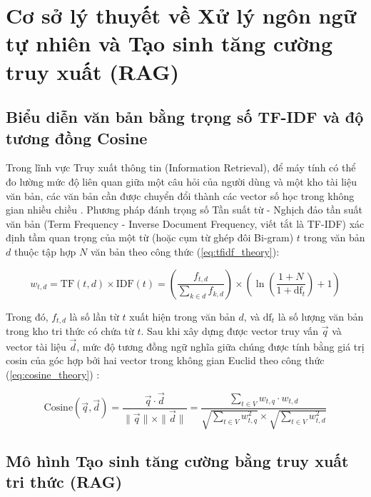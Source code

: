 \section{Cơ sở lý thuyết về Xử lý ngôn ngữ tự nhiên và Tạo sinh tăng cường truy xuất (RAG)}

\subsection{Biểu diễn văn bản bằng trọng số TF-IDF và độ tương đồng Cosine}

Trong lĩnh vực Truy xuất thông tin (Information Retrieval), để máy tính có thể đo lường mức độ liên quan giữa một câu hỏi của người dùng và một kho tài liệu văn bản, các văn bản cần được chuyển đổi thành các vector số học trong không gian nhiều chiều \cite{manning2008ir}. Phương pháp đánh trọng số Tần suất từ - Nghịch đảo tần suất văn bản (Term Frequency - Inverse Document Frequency, viết tắt là TF-IDF) xác định tầm quan trọng của một từ (hoặc cụm từ ghép đôi Bi-gram) $t$ trong văn bản $d$ thuộc tập hợp $N$ văn bản theo công thức (\ref{eq:tfidf_theory}):

\begin{equation}
\label{eq:tfidf_theory}
w_{t,d} = \text{TF}(t, d) \times \text{IDF}(t) = \left( \frac{f_{t,d}}{\sum_{k \in d} f_{k,d}} \right) \times \left( \ln \left( \frac{1 + N}{1 + \text{df}_t} \right) + 1 \right)
\end{equation}

Trong đó, $f_{t,d}$ là số lần từ $t$ xuất hiện trong văn bản $d$, và $\text{df}_t$ là số lượng văn bản trong kho tri thức có chứa từ $t$. Sau khi xây dựng được vector truy vấn $\vec{q}$ và vector tài liệu $\vec{d}$, mức độ tương đồng ngữ nghĩa giữa chúng được tính bằng giá trị cosin của góc hợp bởi hai vector trong không gian Euclid theo công thức (\ref{eq:cosine_theory}) \cite{manning2008ir}:

\begin{equation}
\label{eq:cosine_theory}
\text{Cosine}(\vec{q}, \vec{d}) = \frac{\vec{q} \cdot \vec{d}}{\|\vec{q}\| \times \|\vec{d}\|} = \frac{\sum_{t \in V} w_{t,q} \cdot w_{t,d}}{\sqrt{\sum_{t \in V} w_{t,q}^2} \times \sqrt{\sum_{t \in V} w_{t,d}^2}}
\end{equation}

\subsection{Mô hình Tạo sinh tăng cường bằng truy xuất tri thức (RAG)}

